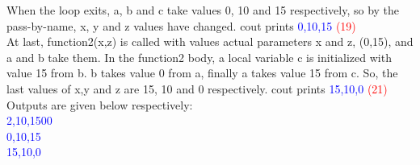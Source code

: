 \documentclass{article}
\begin{document}
\begin{enumerate}[label=\textbf{\alph*)}]
When the loop exits, a, b and c take values 0, 10 and 15 respectively, so by the pass-by-name, x, y and z values have changed.
cout prints \textcolor{blue}{0,10,15} \textcolor{red}{(19)} \\
At last, function2(x,z) is called with values actual parameters x and z, (0,15), and a and b take them. 
In the function2 body, a local variable c is initialized with value 15 from b. b takes value 0 from a, finally a takes value 15 from c. So, the last values of x,y and z are 15, 10 and 0 respectively.
cout prints \textcolor{blue}{15,10,0} \textcolor{red}{(21)} \newpage
Outputs are given below respectively: \\ \textcolor{blue}{2,10,1500\\0,10,15\\15,10,0}
\end{enumerate}
\end{document}
